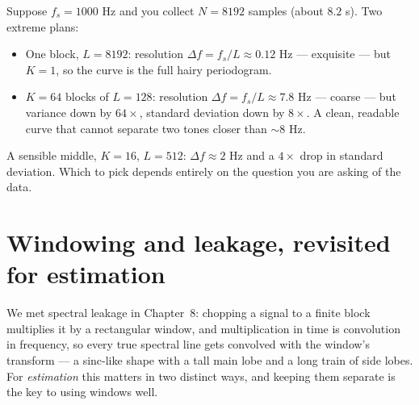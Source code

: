 \begin{example}
\label{ch21:ex-budget}
Suppose $f_s = 1000$ Hz and you collect $N = 8192$ samples (about $8.2$ s).
Two extreme plans:
\begin{itemize}
\item One block, $L=8192$: resolution $\Delta f = f_s/L \approx 0.12$ Hz ---
exquisite --- but $K=1$, so the curve is the full hairy periodogram.
\item $K=64$ blocks of $L=128$: resolution $\Delta f = f_s/L \approx 7.8$ Hz ---
coarse --- but variance down by $64\times$, standard deviation down by $8\times$.
A clean, readable curve that cannot separate two tones closer than $\sim 8$ Hz.
\end{itemize}
A sensible middle, $K=16$, $L=512$: $\Delta f\approx 2$ Hz and a $4\times$ drop in
standard deviation. Which to pick depends entirely on the question you are asking
of the data.
\end{example}

\section{Windowing and leakage, revisited for estimation}
\label{ch21:leakage}

We met spectral leakage in Chapter~8: chopping a signal to a finite block
multiplies it by a rectangular window, and multiplication in time is convolution in
frequency, so every true spectral line gets convolved with the window's transform
--- a sinc-like shape with a tall main lobe and a long train of side lobes. For
\emph{estimation} this matters in two distinct ways, and keeping them separate is
the key to using windows well.

